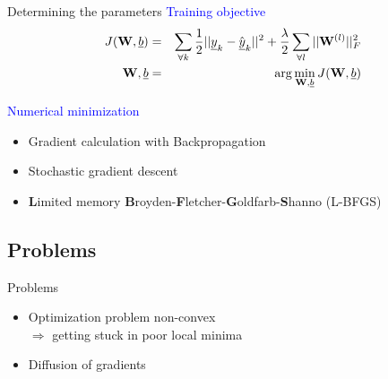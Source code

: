 	\begin{frame}[t]{Determining the parameters}
		\textcolor{blue}{\Large Training objective}
			\begin{eqnarray}
				J({\bf W}, \underline{b}) &=& \sum_{\forall k} \frac{1}{2} ||\underline{y}_k -
\hat{\underline{y}}_k||^2 + \frac{\lambda}{2} \sum_{\forall l} ||{\bf W}^{(l)}||_F^2 \\
				{\bf W}, \underline{b} &=& \arg \min_{{\bf W}, \underline{b}} J({\bf W}, \underline{b})
			\end{eqnarray}
			
		\textcolor{blue}{\Large Numerical minimization}		
		\begin{itemize}
			\item Gradient calculation with Backpropagation
			\item Stochastic gradient descent
			\item {\bf L}imited memory {\bf B}royden-{\bf F}letcher-{\bf G}oldfarb-{\bf S}hanno (L-BFGS)
		\end{itemize}	
	\end{frame}
	
	
	\subsection{Problems}
	\begin{frame}[t]{Problems}
		\begin{itemize}
			\item Optimization problem non-convex\\
			$\Rightarrow$ getting stuck in poor local minima
			\item Diffusion of gradients
		
		\begin{minipage}[t]{0.48\linewidth}
			\begin{figure}
			\end{figure}
		\end{minipage}\hfill
		\begin{minipage}[t]{0.48\linewidth}
			\begin{figure}
			\end{figure}
		\end{minipage}
	\end{itemize}

	\end{frame}
	
